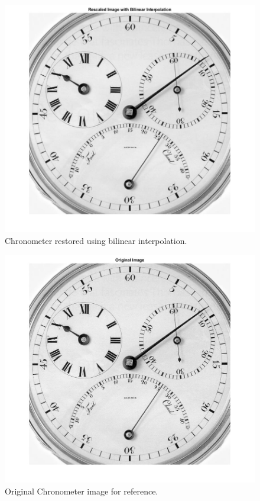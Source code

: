 \documentclass[../report1_rarnold.tex]{subfiles}
\begin{document}
	  \begin{figure}[!htbp]
		\centering
		\includegraphics[scale=0.40]{"bilinear_interp"}
		\caption{Chronometer restored using bilinear interpolation.} 
		\label{2c}
	  \end{figure}	
	  
	  \begin{figure}[!htbp]
		\centering
		\includegraphics[scale=0.40]{"og_image"}
		\caption{Original Chronometer image for reference.} 
		\label{og_image}
	  \end{figure}	
\end{document}

